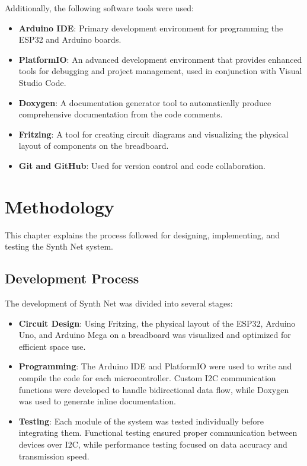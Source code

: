\documentclass[a4paper,12pt]{report}
\begin{document}
    Additionally, the following software tools were used:
    \begin{itemize}
        \item \textbf{Arduino IDE}: Primary development environment for programming the ESP32 and Arduino boards.
        \item \textbf{PlatformIO}: An advanced development environment that provides enhanced tools for debugging and project management, used in conjunction with Visual Studio Code.
        \item \textbf{Doxygen}: A documentation generator tool to automatically produce comprehensive documentation from the code comments.
        \item \textbf{Fritzing}: A tool for creating circuit diagrams and visualizing the physical layout of components on the breadboard.
        \item \textbf{Git and GitHub}: Used for version control and code collaboration.
    \end{itemize}
    
    \newpage
    
    \chapter{Methodology}
    This chapter explains the process followed for designing, implementing, and testing the Synth Net system.
    
    \section{Development Process}
    The development of Synth Net was divided into several stages:
    
    \begin{itemize}
        \item \textbf{Circuit Design}: Using Fritzing, the physical layout of the ESP32, Arduino Uno, and Arduino Mega on a breadboard was visualized and optimized for efficient space use.
        \item \textbf{Programming}: The Arduino IDE and PlatformIO were used to write and compile the code for each microcontroller. Custom I2C communication functions were developed to handle bidirectional data flow, while Doxygen was used to generate inline documentation.
        \item \textbf{Testing}: Each module of the system was tested individually before integrating them. Functional testing ensured proper communication between devices over I2C, while performance testing focused on data accuracy and transmission speed.
    \end{itemize}
    
\end{document}
